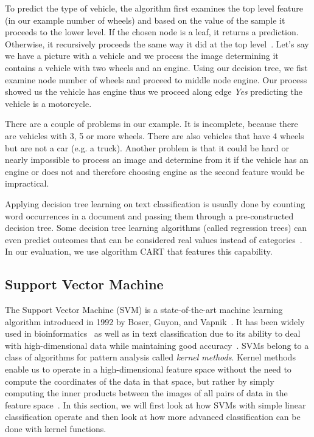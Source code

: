To predict the type of vehicle, the algorithm first examines the top level feature (in our example number of wheels) and based on the value of the sample it proceeds to the lower level. If the chosen node is a leaf, it returns a prediction. Otherwise, it recursively proceeds the same way it did at the top level~\cite{mitchell1997machine}. Let's say we have a picture with a vehicle and we process the image determining it contains a vehicle with two wheels and an engine. Using our decision tree, we fist examine node number of wheels and proceed to middle node engine. Our process showed us the vehicle has engine thus we proceed along edge \textit{Yes} predicting the vehicle is a motorcycle.

There are a couple of problems in our example. It is incomplete, because there are vehicles with 3, 5 or more wheels. There are also vehicles that have 4 wheels but are not a car (e.g. a truck). Another problem is that it could be hard or nearly impossible to process an image and determine from it if the vehicle has an engine or does not and therefore choosing engine as the second feature would be impractical.

Applying decision tree learning on text classification is usually done by counting word occurrences in a document and passing them through a pre-constructed decision tree. Some decision tree learning algorithms (called regression trees) can even predict outcomes that can be considered real values instead of categories~\cite{loh2011cart}. In our evaluation, we use algorithm CART that features this capability.

\subsection{Support Vector Machine}

The Support Vector Machine (SVM) is a state-of-the-art machine learning algorithm introduced in 1992 by Boser, Guyon, and Vapnik~\cite{boser1992training}. It has been widely used in bioinformatics~\cite{byvatov2002support} as well as in text classification due to its ability to deal with high-dimensional data while maintaining good accuracy~\cite{joachims1998text}. SVMs belong to a class of algorithms for pattern analysis called \textit{kernel methods}. Kernel methods enable us to operate in a high-dimensional feature space without the need to compute the coordinates of the data in that space, but rather by simply computing the inner products between the images of all pairs of data in the feature space~\cite{Ben-hur, manning2008introduction}. In this section, we will first look at how SVMs with simple linear classification operate and then look at how more advanced classification can be done with kernel functions.

